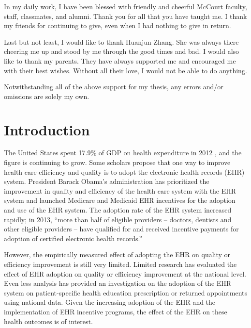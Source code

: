 \documentclass[12pt]{report}
\begin{document}
In my daily work, I have been blessed with friendly and cheerful McCourt faculty, staff, classmates, and alumni. Thank you for all that you have taught me. I thank my friends for continuing to give, even when I had nothing to give in return.

Last but not least, I would like to thank Huanjun Zhang. She was always there cheering me up and stood by me through the good times and bad. I would also like to thank my parents. They have always supported me and encouraged me with their best wishes. Without all their love, I would not be able to do anything.

Notwithstanding all of the above support for my thesis, any errors and/or omissions are solely my own.

\tableofcontents

\listoffigures  %
\listoftables   %

\newpage

\chapter{Introduction}
The United States spent 17.9\% of GDP on health expenditure in 2012 \citep{wbgHealthGDP}, and the figure is continuing to grow. Some scholars propose that one way to improve health care efficiency and quality is to adopt the electronic health records (EHR) system. President Barack Obama’s administration has prioritized the improvement in quality and efficiency of the health care system with the EHR system and launched Medicare and Medicaid EHR incentives for the adoption and use of the EHR system. The adoption rate of the EHR system increased rapidly; in 2013, ``more than half of eligible providers -- doctors, dentists and other eligible providers -- have qualified for and received incentive payments for adoption of certified electronic health records.'' \citep{whitehouseblogintro}

However, the empirically measured effect of adopting the EHR on quality or efficiency improvement is still very limited. Limited research has evaluated the effect of EHR adoption on quality or efficiency improvement at the national level. Even less analysis has provided an investigation on the adoption of the EHR system on patient-specific health education prescription or returned appointments using national data. Given the increasing adoption of the EHR and the implementation of EHR incentive programs, the effect of the EHR on these health outcomes is of interest.
\end{document}
